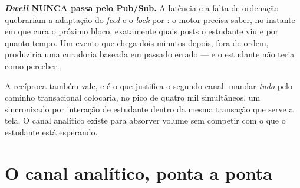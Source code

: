\begin{regra}
\textbf{\emph{Dwell} NUNCA passa pelo Pub/Sub.} A latência e a falta de ordenação
quebrariam a adaptação do \emph{feed} e o \emph{lock} por : o motor
precisa saber, no instante em que cura o próximo bloco, exatamente quais posts o
estudante viu e por quanto tempo. Um evento que chega dois minutos depois, fora de
ordem, produziria uma curadoria baseada em passado errado --- e o estudante não teria
como perceber.
\end{regra}

\begin{nota}
A recíproca também vale, e é o que justifica o segundo canal: mandar \emph{tudo}
pelo caminho transacional colocaria, no pico de quatro mil simultâneos, um
 sincronizado por interação de estudante dentro da mesma transação que
serve a tela. O canal analítico existe para absorver volume sem competir com o
que o estudante está esperando.
\end{nota}

\section{O canal analítico, ponta a ponta}

